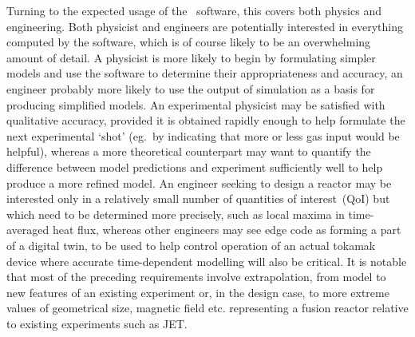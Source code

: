 Turning to the expected usage of the \nep \ software, this covers  both physics and engineering.
Both physicist and engineers are potentially interested in everything computed by the software, which is of course
likely to be an overwhelming amount of detail. A physicist is more likely to begin by
formulating simpler models and use the software to determine their appropriateness and accuracy,
an engineer probably more likely to use the output of simulation as a basis for producing simplified models.
An experimental physicist may be satisfied with qualitative accuracy, provided it is obtained
rapidly enough to help formulate the next experimental `shot' (eg.\ by indicating that more
or less gas input would be helpful), whereas a more theoretical
counterpart may want to quantify the difference between model predictions and experiment 
sufficiently well to help produce a more refined model. An engineer
seeking to design a reactor may be interested only in a relatively small number of
quantities of interest~(QoI) but which need to be determined more precisely, 
such as local maxima in time-averaged heat flux, whereas
other engineers may see edge code as forming a part of a digital twin, to be used to help control
operation of an actual tokamak device where accurate time-dependent modelling will also be critical.
It is notable that most of the preceding requirements involve extrapolation,
from model to new features of an existing experiment or, in the design case, to more
extreme values of geometrical size, magnetic field etc. representing a fusion reactor
relative to existing experiments such as JET.

